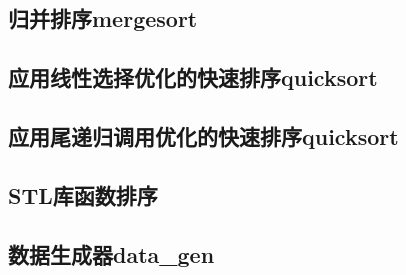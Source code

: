 \subsection{归并排序mergesort}

\subsection{应用线性选择优化的快速排序quicksort}

\subsection{应用尾递归调用优化的快速排序quicksort}

\subsection{STL库函数排序}

\subsection{数据生成器data\_gen}

